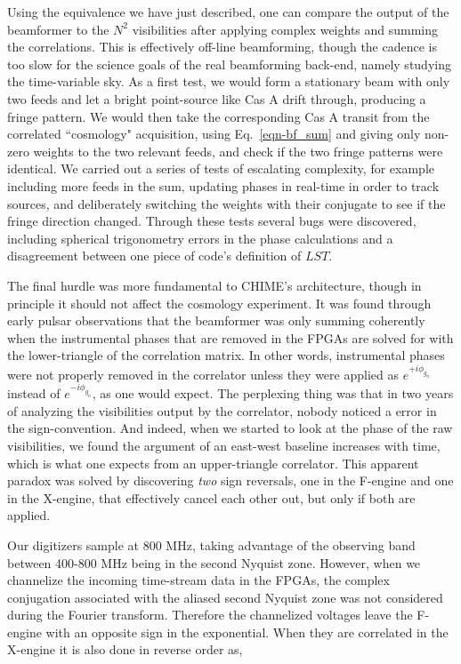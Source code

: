 Using the equivalence we have just described, one can compare the 
output of the beamformer to 
the $N^2$ visibilities after applying complex 
weights and summing the correlations. This is effectively 
off-line beamforming, though the cadence is too slow for 
the science goals of the real beamforming 
back-end, namely studying the time-variable sky. 
As a first test, 
we would form a stationary beam with only two feeds and let a 
bright point-source like Cas A drift through, 
producing a fringe pattern. We would then take 
the corresponding Cas A transit from the correlated ``cosmology" 
acquisition, using Eq.~\ref{eqn-bf_sum} and giving only non-zero 
weights to the two relevant feeds, and check if the two
fringe patterns were identical. We carried out a series 
of tests of escalating complexity, for example including more feeds in the sum, updating 
phases in real-time in order to track sources, and deliberately 
switching the weights with their conjugate to see if the fringe 
direction changed. Through these tests several bugs were discovered, 
including spherical trigonometry errors in the phase 
calculations and a disagreement between one piece of code's 
definition of $LST$. 

The final hurdle was more fundamental to CHIME's architecture,
though in principle it should not affect the cosmology experiment. 
It was found through 
early pulsar observations that the beamformer was only summing
coherently when the instrumental phases that are removed in 
the FPGAs are solved for with the lower-triangle of the correlation 
matrix. In other words, instrumental phases were not properly 
removed in the correlator unless they were applied as 
$e^{+i\phi_{g_n}}$ instead of $e^{-i\phi_{g_n}}$, as one would expect.
The perplexing thing was that in two years of analyzing 
the visibilities output by the correlator, nobody noticed a 
error in the sign-convention. And indeed, when we started to look
at the phase of the raw visibilities, we found the argument 
of an east-west baseline increases with time, which is 
what one expects from an upper-triangle correlator. This 
apparent paradox was solved by discovering \textit{two} sign 
reversals, one in the F-engine and one in the X-engine, that
effectively cancel each other out, but only if both are applied. 

Our digitizers sample at 800 MHz, taking advantage of the observing 
band between 400-800 MHz being in the second Nyquist zone.
However, when we channelize
the incoming time-stream data in the FPGAs, the complex conjugation 
associated with the aliased second Nyquist zone was not considered during the 
Fourier transform. Therefore the channelized voltages leave the F-engine 
with an opposite sign in the exponential. When they are correlated
in the X-engine it is also done in reverse order as, 


